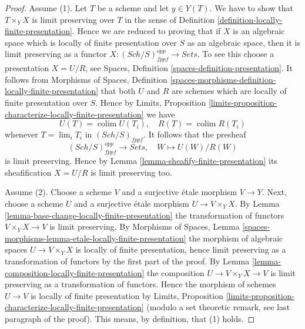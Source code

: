 \documentclass{stacks-project}
\theoremstyle{plain}
\theoremstyle{definition}
\theoremstyle{remark}
\numberwithin{equation}{subsection}
\def\lim{\mathop{\mathrm{lim}}\nolimits}
\def\colim{\mathop{\mathrm{colim}}\nolimits}
\def\Sch{\mathit{Sch}}
\begin{document}
\begin{proof}
Assume (1). Let $T$ be a scheme and let $y \in Y(T)$. We have to show that
$T \times_Y X$ is limit preserving over $T$ in the sense of
Definition \ref{definition-locally-finite-presentation}.
Hence we are reduced to proving that if $X$ is an algebraic space which
is locally of finite presentation over $S$ as an algebraic space, then it
is limit preserving as a functor
$X : (\Sch/S)_{fppf}^{opp} \to \textit{Sets}$.
To see this choose a presentation $X = U/R$, see
Spaces, Definition \ref{spaces-definition-presentation}.
It follows from
Morphisms of Spaces,
Definition \ref{spaces-morphisms-definition-locally-finite-presentation}
that both $U$ and $R$ are schemes which are locally of finite presentation
over $S$. Hence by
Limits, Proposition
\ref{limits-proposition-characterize-locally-finite-presentation}
we have
$$
U(T) = \colim U(T_i), \quad
R(T) = \colim R(T_i)
$$
whenever $T = \lim_i T_i$ in $(\Sch/S)_{fppf}$. It follows
that the presheaf
$$
(\Sch/S)_{fppf}^{opp} \longrightarrow \textit{Sets}, \quad
W \longmapsto U(W)/R(W)
$$
is limit preserving. Hence by
Lemma \ref{lemma-sheafify-finite-presentation}
its sheafification $X = U/R$ is limit preserving too.

\medskip\noindent
Assume (2). Choose a scheme $V$ and a surjective \'etale morphism
$V \to Y$. Next, choose a scheme $U$ and a surjective \'etale morphism
$U \to V \times_Y X$. By
Lemma \ref{lemma-base-change-locally-finite-presentation}
the transformation of functors $V \times_Y X \to V$ is limit preserving. By
Morphisms of Spaces,
Lemma \ref{spaces-morphisms-lemma-etale-locally-finite-presentation}
the morphism of algebraic spaces $U \to V \times_Y X$ is locally
of finite presentation, hence limit preserving as
a transformation of functors by the first part of the proof. By
Lemma \ref{lemma-composition-locally-finite-presentation}
the composition $U \to V \times_Y X \to V$ is limit preserving
as a transformation of functors. Hence
the morphism of schemes $U \to V$ is locally of finite presentation by
Limits, Proposition
\ref{limits-proposition-characterize-locally-finite-presentation}
(modulo a set theoretic remark, see last paragraph of the proof).
This means, by definition, that (1) holds.


\end{proof}
\end{document}
